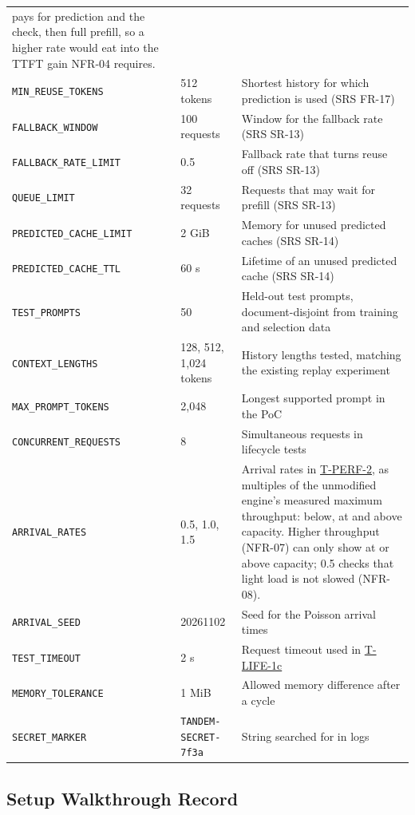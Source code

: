 \documentclass[12pt, titlepage]{article}
\newcommand{\cst}[1]{\texttt{#1}}
\newcommand{\tref}[1]{\hyperref[test:#1]{#1}}
\begin{document}
\begin{longtable}{@{}p{}p{}p{}@{}}
pays for prediction and the check, then full prefill, so a higher rate would
eat into the TTFT gain NFR-04 requires.\\
\cst{MIN\_REUSE\_TOKENS} & 512 tokens & Shortest history for which
prediction is used (SRS FR-17)\\
\cst{FALLBACK\_WINDOW} & 100 requests & Window for the fallback rate (SRS
SR-13)\\
\cst{FALLBACK\_RATE\_LIMIT} & 0.5 & Fallback rate that turns reuse off (SRS
SR-13)\\
\cst{QUEUE\_LIMIT} & 32 requests & Requests that may wait for prefill (SRS
SR-13)\\
\cst{PREDICTED\_CACHE\_LIMIT} & 2 GiB & Memory for unused predicted caches
(SRS SR-14)\\
\cst{PREDICTED\_CACHE\_TTL} & 60 s & Lifetime of an unused predicted cache
(SRS SR-14)\\
\cst{TEST\_PROMPTS} & 50 & Held-out test prompts, document-disjoint from
training and selection data\\
\cst{CONTEXT\_LENGTHS} & 128, 512, 1,024 tokens & History lengths tested,
matching the existing replay experiment\\
\cst{MAX\_PROMPT\_TOKENS} & 2,048 & Longest supported prompt in the PoC\\
\cst{CONCURRENT\_REQUESTS} & 8 & Simultaneous requests in lifecycle tests\\
\cst{ARRIVAL\_RATES} & 0.5, 1.0, 1.5 & Arrival rates in \tref{T-PERF-2}, as
multiples of the unmodified engine's measured maximum throughput: below, at
and above capacity. Higher throughput (NFR-07) can only show at or above
capacity; 0.5 checks that light load is not slowed (NFR-08).\\
\cst{ARRIVAL\_SEED} & 20261102 & Seed for the Poisson arrival times\\
\cst{TEST\_TIMEOUT} & 2 s & Request timeout used in \tref{T-LIFE-1c}\\
\cst{MEMORY\_TOLERANCE} & 1 MiB & Allowed memory difference after a cycle\\
\cst{SECRET\_MARKER} & \texttt{TANDEM-SECRET-}\allowbreak\texttt{7f3a} & String searched for in
logs\\
\bottomrule
\end{longtable}

\subsection{Setup Walkthrough Record}
\label{sec:walkthrough}
\end{document}
